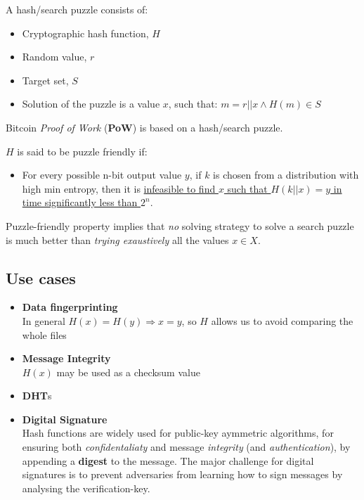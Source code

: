 A hash/search puzzle consists of:
\begin{itemize}
   \item Cryptographic hash function, $H$
   \item Random value, $r$
   \item Target set, $S$
   \item Solution of the puzzle is a value $x$, such that:
   $m = r || x \wedge H(m) \in S$
\end{itemize}
Bitcoin \textit{Proof of Work} (\textbf{PoW}) is based on a hash/search puzzle.
\begin{definition}
   $H$ is said to be puzzle friendly if:
   \begin{itemize}
      \item For every possible n-bit output value $y$, if $k$ is chosen from a distribution with high min entropy, then it is \ul{infeasible to find $x$ such that $H(k || x) = y$ in time significantly less than $2^n$}.
   \end{itemize}
\end{definition}
Puzzle-friendly property implies that
\textit{no} solving strategy to solve a search puzzle is much better than \textit{trying exaustively} all the values $x \in X$.

\subsection{Use cases}
\begin{itemize}
   \item \textbf{Data fingerprinting}\\
   In general $H(x) = H(y) \Rightarrow x = y$, so $H$ allows us to avoid comparing the whole files
   \item \textbf{Message Integrity}\\
   $H(x)$ may be used as a checksum value
   \item \textbf{DHT}s
   \item \textbf{Digital Signature}\\
   Hash functions are widely used for public-key aymmetric algorithms, for ensuring both \textit{confidentaliaty} and message \textit{integrity} (and \textit{authentication}), by appending a \textbf{digest} to the message.
   The major challenge for digital signatures is to prevent adversaries from learning how to sign messages by analysing the verification-key.
   
\end{itemize}



